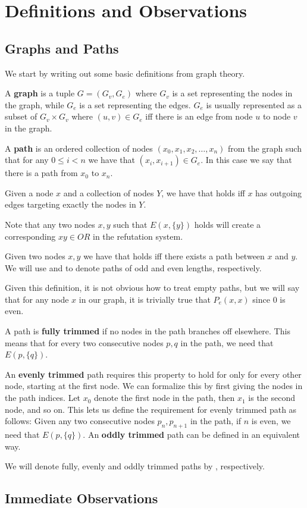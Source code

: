 \section{Definitions and Observations}
\label{sec:Definitions and Observations}
\subsection{Graphs and Paths}
\label{sub:Graphs and Paths}
We start by writing out some basic definitions from graph theory.
\begin{definition}
  A \textbf{graph} is a tuple $G = (G_v, G_e)$ where $G_v$ is a set representing the nodes in the graph, while $G_e$ is a set representing the edges.  $G_e$ is usually represented as a subset of $G_v \times G_v$ where $(u,v) \in G_e$ iff there is an edge from node $u$ to node $v$ in the graph.
\end{definition}
\begin{definition}
  A \textbf{path} is an ordered collection of nodes $(x_0, x_1, x_2, \dots, x_n)$ from the graph such that for any $0 \leq i < n$ we have that $(x_i, x_{i+1}) \in G_e$.  In this case we say that there is a path from $x_0$ to $x_n$.
\end{definition}
\begin{definition}
  Given a node $x$ and a collection of nodes $Y$, we have that  holds iff $x$ has outgoing edges targeting exactly the nodes in $Y$.
\end{definition}
Note that any two nodes $x,y$ such that $E(x,\{y\})$ holds will create a corresponding $xy \in OR$ in the refutation system.
\begin{definition}
  Given two nodes $x,y$ we have that  holds iff there exists a path between $x$ and $y$.
  We will use  and  to denote paths of odd and even lengths, respectively.
\end{definition}
  Given this definition, it is not obvious how to treat empty paths, but we will say that for any node $x$ in our graph, it is trivially true that $P_e(x,x)$ since $0$ is even.
\begin{definition}
  A path is \textbf{fully trimmed} if no nodes in the path branches off elsewhere.
  This means that for every two consecutive nodes $p,q$ in the path, we need that $E(p,\{q\})$.
\end{definition}

An \textbf{evenly trimmed} path requires this property to hold for only for every other node, starting at the first node.
We can formalize this by first giving the nodes in the path indices.
Let $x_0$ denote the first node in the path, then $x_1$ is the second node, and so on.
This lets us define the requirement for evenly trimmed path as follows: Given any two consecutive nodes $p_n,p_{n+1}$ in the path, if $n$ is even, we need that $E(p,\{q\})$.
An \textbf{oddly trimmed} path can be defined in an equivalent way.

We will denote fully, evenly and oddly trimmed paths by , respectively.

\subsection{Immediate Observations}
\label{sub:Immediate Observations}
